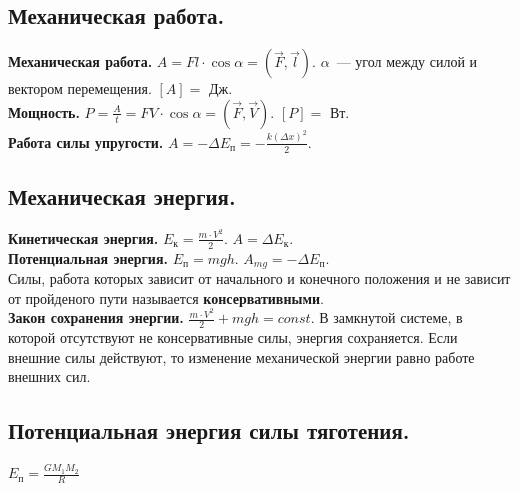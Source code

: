 \documentclass{article}
\begin{document}
	\subsection{Механическая работа.}
	\textbf{Механическая работа.} $A = Fl \cdot \cos \alpha = (\vec{F}, \vec{l})$. $\alpha$~--- угол между силой и вектором перемещения. $[A] =$ Дж. \\
	\textbf{Мощность.} $P = \frac{A}{t} = FV \cdot \cos \alpha = (\vec{F}, \vec{V})$. $[P] =$ Вт. \\
	\textbf{Работа силы упругости.} $A = -\varDelta E_{\text{п}} = -\frac{k (\varDelta x)^2}{2}$.
	\subsection{Механическая энергия.}
	\textbf{Кинетическая энергия.} $E_{\text{к}} = \frac{m \cdot V^2}{2}$. $A = \varDelta E_{\text{к}}$. \\
	\textbf{Потенциальная энергия.} $E_{\text{п}} = mgh$. $A_{mg} = - \varDelta E_{\text{п}}$. \\
	Силы, работа которых зависит от начального и конечного положения и не зависит от пройденого пути называется \textbf{консервативными}. \\
	\textbf{Закон сохранения энергии.} $\frac{m \cdot V^2}{2} + mgh = const$. В замкнутой системе, в которой отсутствуют не консервативные силы, энергия сохраняется. Если внешние силы действуют, то изменение механической энергии равно работе внешних сил.
	\subsection{Потенциальная энергия силы тяготения.}
	$E_{\text{п}} = \frac{GM_1M_2}{R}$
\end{document}
